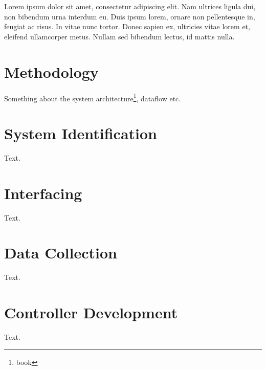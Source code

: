 Lorem ipsum dolor sit amet, consectetur adipiscing elit. Nam ultrices ligula dui, non bibendum urna interdum eu. Duis ipsum lorem, ornare non pellentesque in, feugiat ac risus. In vitae nunc tortor. Donec sapien ex, ultricies vitae lorem et, eleifend ullamcorper metus. Nullam sed bibendum lectus, id mattis nulla.

\section{Methodology}
Something about the system architecture\footnote{book}, dataflow etc.

\section{System Identification}
Text.

\section{Interfacing}
Text.

\section{Data Collection}
Text.

\section{Controller Development}
Text.